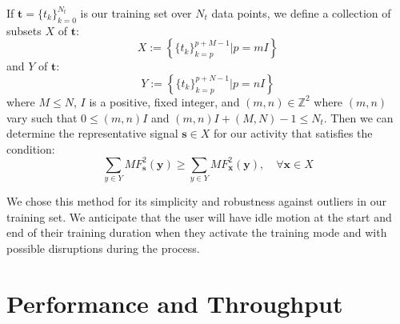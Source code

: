 \documentclass[journal]{IEEEtran}
\begin{document}
If $\textbf{t} = \{t_k\}_{k=0}^{N_t}$ is our training set over $N_t$ data points, we define a collection of subsets $X$ of $\textbf{t}$:
%
\begin{equation} \label{eq:X_subsets_of_training_eq}
X := \left \{ \{t_k\}_{k=p}^{p+M-1} | p=mI \right \}
\end{equation}
%
and $Y$ of $\textbf{t}$:
%
\begin{equation} \label{eq:Y_subsets_of_training_eq}
Y := \left \{ \{t_k\}_{k=p}^{p+N-1} | p=nI \right \}
\end{equation}
%
where $M \leq N$, $I$ is a positive, fixed integer, and $(m,n) \in \mathbb{Z}^2$ where $(m,n)$ vary such that $0 \leq (m,n)I$ and $(m,n)I + (M,N) - 1 \leq N_t$. Then we can determine the representative signal $\textbf{s} \in X$ for our activity that satisfies the condition:
%
\begin{equation} \label{eq:s_condition}
\sum_{y \in Y}MF^2_{\textbf{s}}(\textbf{y}) \geq \sum_{y \in Y}MF^2_{\textbf{x}}(\textbf{y}), \quad \forall \textbf{x} \in X
\end{equation}

We chose this method for its simplicity and robustness against outliers in our training set. We anticipate that the user will have idle motion at the start and end of their training duration when they activate the training mode and with possible disruptions during the process.
%
\section{Performance and Throughput}
%
\end{document}
